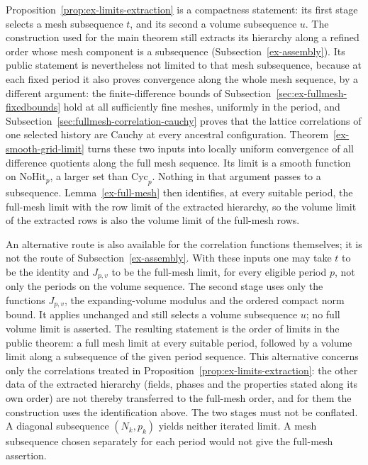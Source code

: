 \begin{remark}
\label{rem:ex-limits-fullmesh}
Proposition~\ref{prop:ex-limits-extraction} is a compactness statement: its
first stage selects a mesh subsequence $t$, and its second a volume
subsequence $u$. The construction used for the main theorem still extracts
its hierarchy along a refined order whose mesh component is a subsequence
(Subsection~\ref{ex-assembly}). Its public statement is nevertheless not limited
to that mesh subsequence, because at each fixed period it also proves
convergence along the whole mesh sequence, by a different argument: the
finite-difference bounds of
Subsection~\ref{sec:ex-fullmesh-fixedbounds} hold at all sufficiently fine
meshes, uniformly in the period, and
Subsection~\ref{sec:fullmesh-correlation-cauchy} proves that the lattice
correlations of one selected history are Cauchy at every ancestral
configuration. Theorem~\ref{ex-smooth-grid-limit} turns these two inputs into
locally uniform convergence of all difference quotients along the full mesh
sequence. Its limit is a smooth function on $\mathrm{NoHit}_p$, a larger set
than $\mathrm{Cyc}_p$. Nothing in that argument passes to a subsequence.
Lemma~\ref{ex-full-mesh} then identifies, at every suitable period, the
full-mesh limit with the row limit of the extracted hierarchy, so the volume
limit of the extracted rows is also the volume limit of the full-mesh rows.

An alternative route is also available for the correlation functions
themselves; it is not the route of Subsection~\ref{ex-assembly}. With these
inputs one may take $t$ to be the identity and $J_{p,v}$ to be the full-mesh
limit, for every eligible period $p$, not only the periods on the volume
sequence. The second
stage uses only the functions $J_{p,v}$, the expanding-volume modulus and the
ordered compact norm bound. It applies unchanged and still selects a volume
subsequence $u$; no full volume limit is asserted. The resulting statement is
the order of limits in the public theorem: a full mesh limit at every suitable
period, followed by a volume limit along a subsequence of the given period
sequence. This alternative concerns only the correlations treated in
Proposition~\ref{prop:ex-limits-extraction}: the other data of the extracted
hierarchy (fields, phases and the properties stated along its own order) are
not thereby transferred to the full-mesh order, and for them the construction
uses the identification above. The two stages must not be conflated. A diagonal subsequence
$(N_k,p_k)$ yields neither iterated limit. A mesh subsequence chosen
separately for each period would not give the full-mesh assertion.
\end{remark}
